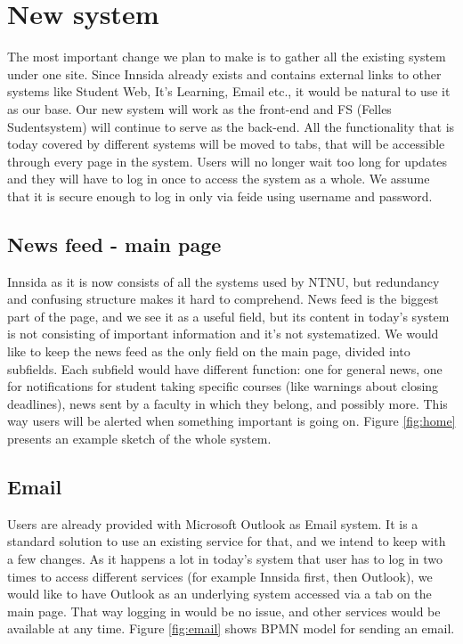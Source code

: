
\chapter{New system}
The most important change we plan to make is to gather all the existing system under one site. Since Innsida already exists and contains external links to other systems like Student Web, It’s Learning, Email etc., it would be natural to use it as our base. Our new system will work as the front-end and FS (Felles Sudentsystem) will continue to serve as the back-end. All the functionality that is today covered by different systems will be moved to tabs, that will be accessible through every page in the system. Users will no longer wait too long for updates and they will have to log in once to access the system as a whole. We assume that it is secure enough to log in only via feide using username and password.

\section{News feed - main page}
Innsida as it is now consists of all the systems used by NTNU, but redundancy and confusing structure makes it hard to comprehend. News feed is the biggest part of the page, and we see it as a useful field, but its content in today's system is not consisting of important information and it's not systematized. We would like to keep the news feed as the only field on the main page, divided into subfields. Each subfield would have different function: one for general news, one for notifications for student taking specific courses (like warnings about closing deadlines), news sent by a faculty in which they belong, and possibly more. This way users will be alerted when something important is going on. Figure \ref{fig:home} presents an example sketch of the whole system. 

\section{Email}
Users are already provided with Microsoft Outlook as Email system. It is a standard solution to use an existing service for that, and we intend to keep with a few changes. As it happens a lot in today's system that user has to log in two times to access different services (for example Innsida first, then Outlook), we would like to have Outlook as an underlying system accessed via a tab on the main page. That way logging in would be no issue, and other services would be available at any time. Figure \ref{fig:email} shows BPMN model for sending an email.

